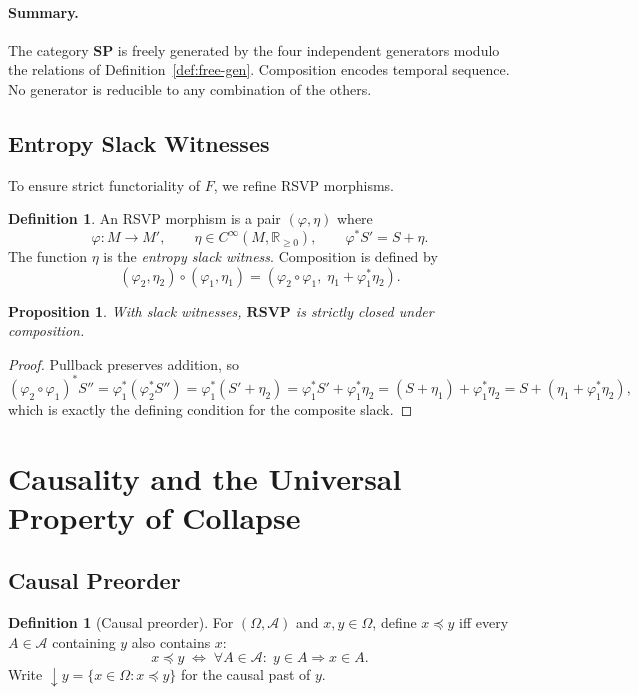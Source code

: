 \documentclass[12pt,a4paper]{article}
\newtheorem{proposition}[theorem]{Proposition}
\theoremstyle{definition}
\newtheorem{definition}[theorem]{Definition}
\theoremstyle{remark}
\newcommand{\Rnn}{\mathbb{R}_{\ge 0}}
\newcommand{\SP}{\mathbf{SP}}
\newcommand{\RSVP}{\mathbf{RSVP}}
\newcommand{\SF}{S}
\newcommand{\downset}[1]{\!\downarrow\!{#1}}
\begin{document}
\paragraph{Summary.} The category $\SP$ is freely generated by the four independent
generators modulo the relations of Definition~\ref{def:free-gen}. Composition encodes
temporal sequence. No generator is reducible to any combination of the others.
\subsection{Entropy Slack Witnesses}

To ensure strict functoriality of $F$, we refine RSVP morphisms.

\begin{definition}
An RSVP morphism is a pair $(\varphi,\eta)$ where
\[
\varphi:M\to M', \qquad \eta\in C^\infty(M,\Rnn), \qquad \varphi^*\SF'=\SF+\eta.
\]
The function $\eta$ is the \emph{entropy slack witness}. Composition is defined by
\[
(\varphi_2,\eta_2)\circ(\varphi_1,\eta_1)
=
(\varphi_2\circ\varphi_1,\; \eta_1+\varphi_1^*\eta_2).
\]
\end{definition}

\begin{proposition}
With slack witnesses, $\RSVP$ is strictly closed under composition.
\end{proposition}

\begin{proof}
Pullback preserves addition, so
\[
(\varphi_2\circ\varphi_1)^*\SF''
=\varphi_1^*(\varphi_2^*\SF'')
=\varphi_1^*(\SF'+\eta_2)
=\varphi_1^*\SF'+\varphi_1^*\eta_2
=(\SF+\eta_1)+\varphi_1^*\eta_2
=\SF+(\eta_1+\varphi_1^*\eta_2),
\]
which is exactly the defining condition for the composite slack.
\end{proof}

\section{Causality and the Universal Property of Collapse}
\label{sec:causality}

\subsection{Causal Preorder}

\begin{definition}[Causal preorder]
\label{def:causal-preorder}
For $(\Omega,\mathcal{A})$ and $x,y\in\Omega$, define $x\preceq y$ iff every
$A\in\mathcal{A}$ containing $y$ also contains $x$:
\[
  x\preceq y \;\iff\; \forall A\in\mathcal{A}:\; y\in A\Rightarrow x\in A.
\]
Write $\downset{y}=\{x\in\Omega:x\preceq y\}$ for the causal past of $y$.
\end{definition}
\end{document}
